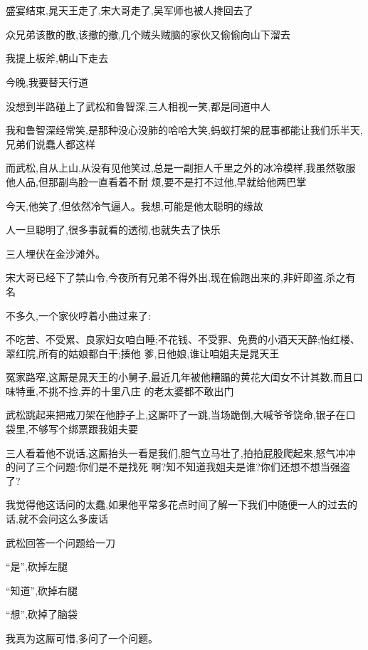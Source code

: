 ﻿\documentclass[12pt]{article}
\begin{document}
\section{}

盛宴结束,晁天王走了,宋大哥走了,吴军师也被人搀回去了

众兄弟该散的散,该撤的撤,几个贼头贼脑的家伙又偷偷向山下溜去\dldots

我提上板斧,朝山下走去

今晚,我要替天行道

没想到半路碰上了武松和鲁智深,三人相视一笑,都是同道中人\dldots

我和鲁智深经常笑,是那种没心没肺的哈哈大笑,蚂蚁打架的屁事都能让我们乐半天,兄弟们说蠢人都这样\dldots

而武松,自从上山,从没有见他笑过,总是一副拒人千里之外的冰冷模样,我虽然敬服他人品,但那副鸟脸一直看着不耐
烦,要不是打不过他,早就给他两巴掌\dldots

今天,他笑了,但依然冷气逼人。我想,可能是他太聪明的缘故

人一旦聪明了,很多事就看的透彻,也就失去了快乐

三人埋伏在金沙滩外。

宋大哥已经下了禁山令,今夜所有兄弟不得外出,现在偷跑出来的,非奸即盗,杀之有名

不多久,一个家伙哼着小曲过来了:

不吃苦、不受累、良家妇女咱白睡;不花钱、不受罪、免费的小酒天天醉;怡红楼、翠红院,所有的姑娘都白干;揍他
爹,日他娘,谁让咱姐夫是晁天王

冤家路窄,这厮是晁天王的小舅子,最近几年被他糟蹋的黄花大闺女不计其数,而且口味特重,不挑不捡,弄的十里八庄
的老太婆都不敢出门\dldots

武松跳起来把戒刀架在他脖子上,这厮吓了一跳,当场跪倒,大喊爷爷饶命,银子在口袋里,不够写个绑票跟我姐夫要

三人看着他不说话,这厮抬头一看是我们,胆气立马壮了,拍拍屁股爬起来,怒气冲冲的问了三个问题:你们是不是找死
啊?知不知道我姐夫是谁?你们还想不想当强盗了?

我觉得他这话问的太蠢,如果他平常多花点时间了解一下我们中随便一人的过去的话,就不会问这么多废话

武松回答一个问题给一刀

``是'',砍掉左腿

``知道'',砍掉右腿

``想'',砍掉了脑袋

我真为这厮可惜,多问了一个问题。
\section{}
\end{document}
